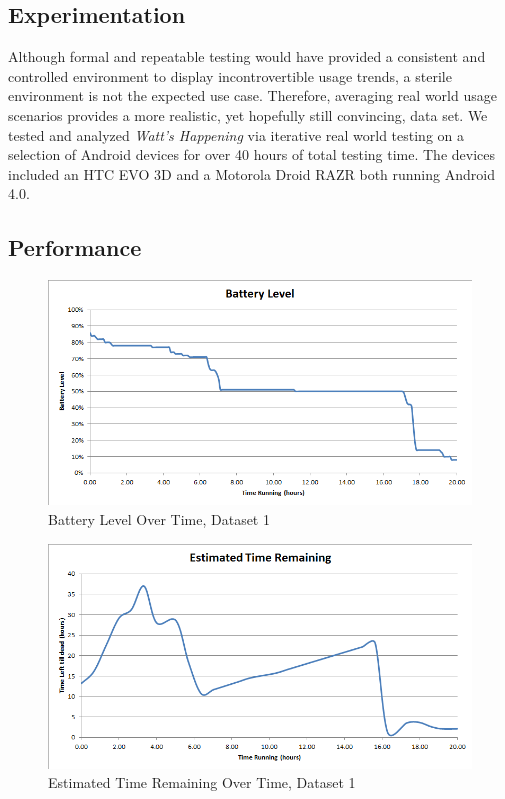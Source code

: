 \subsection{Experimentation}
Although formal and repeatable testing would have provided a consistent and controlled environment to display incontrovertible usage trends, a sterile environment is not the expected use case.
Therefore, averaging real world usage scenarios provides a more realistic, yet hopefully still convincing, data set.
We tested and analyzed \emph{Watt's Happening} via iterative real world testing on a selection of Android devices for over 40 hours of total testing time.
The devices included an HTC EVO 3D and a Motorola Droid RAZR both running Android 4.0. 

\subsection{Performance}
\begin{figure}[h]
	\begin{center}
		\includegraphics[scale=0.5]{figs/BatteryLevelLong.png}
		\caption{Battery Level Over Time, Dataset 1}
		\label{fig:bat_level}
\end{center}
\end{figure}
\begin{figure}[h]
	\begin{center}
		\includegraphics[scale=0.5]{figs/EstimatedTimeRemainingLong.png}
		\caption{Estimated Time Remaining Over Time, Dataset 1}
		\label{fig:est_remaining}
\end{center}
\end{figure}
